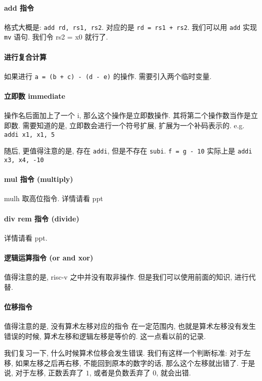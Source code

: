 \documentclass[12pt]{ctexart}
\theoremstyle{definition}
\theoremstyle{definition}
\theoremstyle{plain}
\begin{document}
\paragraph{add 指令}
格式大概是: \texttt{add rd, rs1, rs2}.
对应的是 \texttt{rd = rs1 + rs2}.
我们可以用 \texttt{add} 实现 \texttt{mv} 语句.
我们令 rs2 = x0 就行了.

\paragraph{进行复合计算}
如果进行 \texttt{a = (b + c) - (d - e)} 的操作. 需要引入两个临时变量.

\paragraph{立即数 immediate}
操作名后面加上了一个 i, 那么这个操作是立即数操作. 
其将第二个操作数当作是立即数. 
需要知道的是, 立即数会进行一个符号扩展, 扩展为一个补码表示的.
e.g. \texttt{addi x1, x1, 5}

随后, 更值得注意的是, 存在 \texttt{addi}, 但是不存在 \texttt{subi}. 
\texttt{f = g - 10}
实际上是 \texttt{addi x3, x4, -10}

\paragraph{mul 指令 (multiply)}
mulh 取高位指令. 详情请看 ppt 

\paragraph{div rem 指令 (divide)} 
详情请看 ppt. 

\paragraph{逻辑运算指令 (or and xor)} 
值得注意的是, risc-v 之中并没有取非操作. 
但是我们可以使用前面的知识, 进行代替. 

\paragraph{位移指令}
值得注意的是, 没有算术左移对应的指令
在一定范围内, 也就是算术左移没有发生错误的时候, 算术左移和逻辑左移是等价的. 这一点看以前的记录. 

我们复习一下, 什么时候算术位移会发生错误. 我们有这样一个判断标准: 对于左移, 如果左移之后再右移, 不能回到原本的数字的话, 
那么这个左移就出错了. 于是说, 对于左移, 正数丢弃了 \(1\), 或者是负数丢弃了 \(0\), 就会出错.
\end{document}
